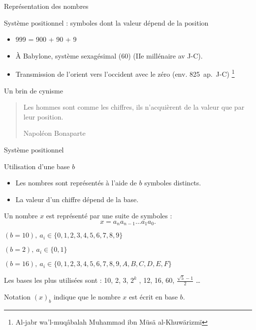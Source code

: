 \begin{frame}{Représentation des nombres}
  \begin{alertblock}{Système positionnel : symboles dont la valeur dépend de la position}
    \begin{itemize}
    \item 999 = 900 + 90 + 9
    \item À Babylone, système sexagésimal (60) (IIe millénaire av J-C).
    \item Transmission de l'orient vers l'occident avec le zéro (env. 825~ap.~J-C)
      \footnote{\og Al-jabr wa’l-muqâbalah \fg  Muhammad ibn Müsä al-Khuwärizmï}
    \end{itemize}
  \end{alertblock}

  \begin{block}{Un brin de cynisme}
    \begin{quote}
      Les hommes sont comme les chiffres, ils n'acquièrent de la valeur que par leur position.
      \begin{flushright}
        Napoléon Bonaparte
      \end{flushright}
    \end{quote}
  \end{block}
\end{frame}


\begin{frame}{Système positionnel}
  \begin{block}{Utilisation d'une base $b$}
  \begin{itemize}
  \item Les nombres sont représentés à l’aide de $b$ symboles distincts.
  \item La valeur d’un chiffre dépend de la base.
  \end{itemize}
  \end{block}

  \begin{alertblock}{Un nombre $x$ est représenté par une suite de symboles :}
    \alert{
      \[
        x = a_n a_{n-1} \ldots a_1 a_0 .
      \]
    }
  \end{alertblock}

    \begin{description}[Hexadécimale]
  \item[Décimale] $(b = 10),\ a_i \in \{0, 1, 2, 3, 4, 5, 6, 7, 8, 9\}$
  \item[Binaire] $(b = 2),\ a_i \in \{0, 1\}$
  \item[Hexadécimale] $(b = 16),\ a_i \in \{0, 1, 2, 3, 4, 5, 6, 7, 8, 9, A, B, C, D, E, F\}$
  \end{description}
  Les bases les plus utilisées sont : 10, 2, 3, $2^k$ , 12, 16, 60, $\frac{\sqrt{5}- 1}{2}$ \dots \\
  \begin{block}{Notation}
    $(x)_b$ indique que le nombre $x$ est écrit en base $b$.
  \end{block}

\end{frame}


